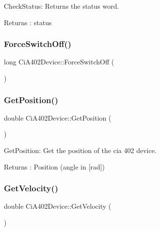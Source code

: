 Check\+Status\+: Returns the status word. 

\begin{DoxyReturn}{Returns}
\+: status 
\end{DoxyReturn}
\mbox{\label{classCiA402Device_aff0503b4caa6d2a8e2e66df6b9e0f4e4}} 
\subsubsection{\texorpdfstring{Force\+Switch\+Off()}{ForceSwitchOff()}}
{\footnotesize\ttfamily long Ci\+A402\+Device\+::\+Force\+Switch\+Off (\begin{DoxyParamCaption}{ }\end{DoxyParamCaption})}

\mbox{\label{classCiA402Device_ac8d9e36e6f457565cac7d26d91e4a712}} 
\subsubsection{\texorpdfstring{Get\+Position()}{GetPosition()}}
{\footnotesize\ttfamily double Ci\+A402\+Device\+::\+Get\+Position (\begin{DoxyParamCaption}{ }\end{DoxyParamCaption})}



Get\+Position\+: Get the position of the cia 402 device. 

\begin{DoxyReturn}{Returns}
\+: Position (angle in \mbox{[}rad\mbox{]}) 
\end{DoxyReturn}
\mbox{\label{classCiA402Device_a54b43f6429da4c6c0241653355e81d36}} 
\subsubsection{\texorpdfstring{Get\+Velocity()}{GetVelocity()}}
{\footnotesize\ttfamily double Ci\+A402\+Device\+::\+Get\+Velocity (\begin{DoxyParamCaption}{ }\end{DoxyParamCaption})}

